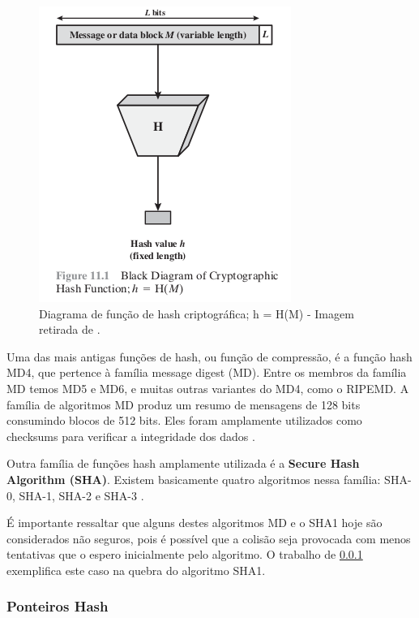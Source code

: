                 \begin{figure}[h]
                     \centering
                     \includegraphics[scale=0.5]{figuras/capitulo_2/hash_function.png}
                     \caption{Diagrama de função de hash criptográfica; h = H(M) - Imagem retirada de \cite{cryptograpy_and_network_stallings}.}
                     \label{fig:hash_function}
                \end{figure}
                
        Uma das mais antigas funções de hash, ou função de compressão, é a função hash MD4, que pertence à família message digest (MD). Entre os membros da família MD temos MD5 e MD6, e muitas outras variantes do MD4, como o RIPEMD. A família de algoritmos MD produz um resumo de mensagens de 128 bits consumindo blocos de 512 bits. Eles foram amplamente utilizados como checksums para verificar a integridade dos dados \cite{beginnig_blockchain_bikramaditya}.
        
        Outra família de funções hash amplamente utilizada é a \textbf{Secure Hash Algorithm (SHA)}. Existem basicamente quatro algoritmos nessa família: SHA-0, SHA-1, SHA-2 e SHA-3 \cite{beginnig_blockchain_bikramaditya}.

	É importante ressaltar que alguns destes algoritmos MD e o SHA1 hoje são considerados não seguros, pois é possível que a colisão seja provocada com menos tentativas que o espero inicialmente pelo algoritmo. O trabalho de \ref{} exemplifica este caso na quebra do algoritmo SHA1.
    
        \subsubsection{Ponteiros Hash}
        
